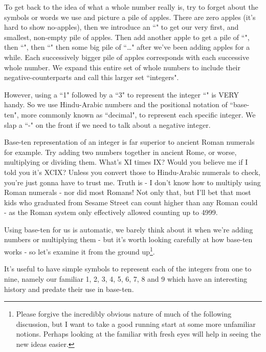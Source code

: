 \documentclass{article}
\begin{document}
To get back to the idea of what a whole number really is,
try to forget about the symbols or words we use and picture a pile of apples.
There are zero apples (it's hard to show no-apples),
then we introduce an ``\faApple{}" to get our very first,
and smallest, non-empty pile of apples.
Then add another apple to get a pile of ``\faApple{}\faApple{}",
then ``\faApple{}\faApple{}\faApple{}",
then ``\faApple{}\faApple{}\faApple{}\faApple{}"
then some big pile of
``\faApple{}\faApple{}\faApple{}\faApple{}\faApple{}\dots{}\faApple{}\faApple{}\faApple{}"
after we've been adding apples for a while.
Each successively bigger pile of apples corresponds with each successive whole number.
%
We expand this entire set of whole numbers to include their
negative-counterparts and call this larger set ``integers".

However, using a ``1" followed by a ``3" to represent the integer
``\faApple{}\faApple{}\faApple{}\faApple{}\faApple{}\faApple{}\faApple{}\faApple{}\faApple{}\faApple{}\faApple{}\faApple{}\faApple{}"
is VERY handy. So we use Hindu-Arabic numbers and the positional notation of ``base-ten",
more commonly known as ``decimal", to represent each specific integer.
We slap a ``-" on the front if we need to talk about a negative integer.

Base-ten representation of an integer is far superior to ancient Roman numerals for example.
Try adding two numbers together in ancient Rome, or worse,
multiplying or dividing them.
What's XI times IX? Would you believe me if I told
you it's XCIX? Unless you convert those to Hindu-Arabic numerals to check,
you're just gonna have to trust me.
Truth is - I don't know how to multiply using Roman
numerals - nor did most Romans! Not only that,
but I'll bet that most kids who graduated from Sesame Street
can count higher than any Roman could - as the
Roman system only effectively allowed counting up to 4999.

Using base-ten for us is automatic,
we barely think about it when we're adding numbers or multiplying
them - but it's worth looking carefully at how base-ten
works - so let's examine it from the ground up\footnote{Please forgive
the incredibly obvious nature of much
of the following discussion, but I want to take a good running start
at some more unfamiliar notions.
Perhaps looking at the familiar with fresh eyes will help in seeing the new ideas easier.}.

It's useful to have simple symbols to represent each of the integers from one to nine,
namely our familiar 1, 2, 3, 4, 5, 6, 7, 8 and 9
which have an interesting history and predate their use in base-ten.
\end{document}
